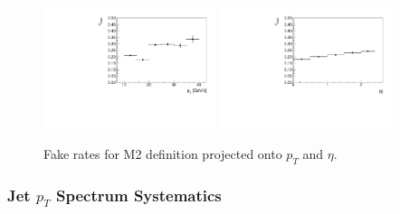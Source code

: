 \begin{figure}[!htbp]
\begin{center}
\includegraphics[width=0.45\textwidth]{figures/muon_frpt_m2.pdf}
\includegraphics[width=0.45\textwidth]{figures/muon_freta_m2.pdf}
\caption{Fake rates for M2 definition projected onto $p_T$ and $\eta$.}
\label{fig:mu_fr_iso04_jet15}
\end{center}
\end{figure}


\subsubsection{Jet $p_{T}$ Spectrum Systematics}
\label{sec:FakeMuonBkgJetSpectrumSystematics}

